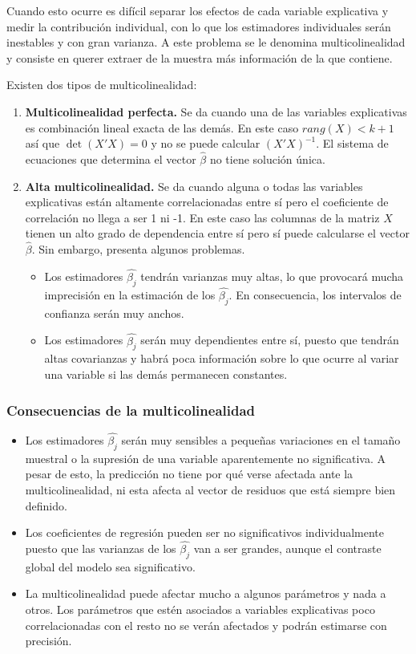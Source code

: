 Cuando esto ocurre es difícil separar los efectos de cada variable explicativa y medir la contribución individual, con lo que los estimadores individuales serán inestables y con gran varianza.
A este problema se le denomina multicolinealidad y consiste en querer extraer de la muestra más información de la que contiene.

Existen dos tipos de multicolinealidad:
\begin{enumerate}
    \item \textbf{Multicolinealidad perfecta.}
          Se da cuando una de las variables explicativas es combinación lineal exacta de las demás.
          En este caso $rang(X) < k+1$ así que $\det(X'X) = 0$ y no se puede calcular $(X'X)^{-1}$.
          El sistema de ecuaciones que determina el vector $\hat{\beta}$ no tiene solución única.
    \item \textbf{Alta multicolinealidad.}
          Se da cuando alguna o todas las variables explicativas están altamente correlacionadas entre sí pero el coeficiente de correlación no llega a ser 1 ni -1.
          En este caso las columnas de la matriz $X$ tienen un alto grado de dependencia entre sí pero sí puede calcularse el vector $\hat{\beta}$.
          Sin embargo, presenta algunos problemas.
          \begin{itemize}
              \item Los estimadores $\hat{\beta_j}$ tendrán varianzas muy altas, lo que provocará mucha imprecisión en la estimación de los $\hat{\beta_j}$.
                    En consecuencia, los intervalos de confianza serán muy anchos.
              \item Los estimadores $\hat{\beta_j}$ serán muy dependientes entre sí, puesto que tendrán altas covarianzas y habrá poca información sobre lo que ocurre al variar una variable si las demás permanecen constantes.
          \end{itemize}
\end{enumerate}

\subsubsection*{Consecuencias de la multicolinealidad}
\begin{itemize}
    \item Los estimadores $\hat{\beta_j}$ serán muy sensibles a pequeñas variaciones en el tamaño muestral o la supresión de una variable aparentemente no significativa.
          A pesar de esto, la predicción no tiene por qué verse afectada ante la multicolinealidad, ni esta afecta al vector de residuos que está siempre bien definido.
    \item Los coeficientes de regresión pueden ser no significativos individualmente puesto que las varianzas de los $\hat{\beta_j}$ van a ser grandes, aunque el contraste global del modelo sea significativo.
    \item La multicolinealidad puede afectar mucho a algunos parámetros y nada a otros.
          Los parámetros que estén asociados a variables explicativas poco correlacionadas con el resto no se verán afectados y podrán estimarse con precisión.
\end{itemize}

